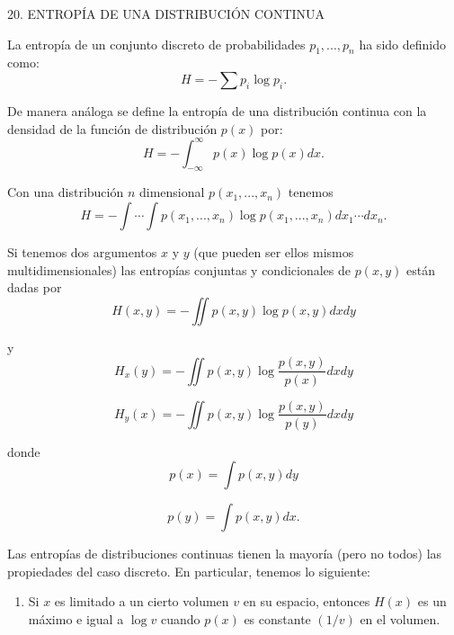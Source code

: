 20. ENTROP\'IA DE UNA DISTRIBUCI\'ON CONTINUA
\newline

La entrop\'ia de un conjunto discreto de probabilidades $p_1, ..., p_n$ ha sido
definido como:
\begin{equation}
  H = -\sum p_i \log p_i.
\end{equation}

De manera an\'aloga se define la entrop\'ia de una distribuci\'on continua con
la densidad de la funci\'on de distribución $p(x)$ por:
\begin{equation}
  H = -\int_{-\infty}^{\infty} p(x) \log p(x)dx.
\end{equation}

Con una distribuci\'on $n$ dimensional $p(x_1, ..., x_n)$ tenemos
\begin{equation}
  H = -\int \cdots \int p(x_1, ..., x_n) \log p(x_1, ..., x_n)dx_1 \cdots dx_n.
\end{equation}

Si tenemos dos argumentos $x$ y $y$ (que pueden ser ellos mismos
multidimensionales) las entrop\'ias conjuntas y condicionales de $p(x, y)$
est\'an dadas por
\begin{equation}
  H(x, y) = -\iint p(x, y) \log p(x, y)dxdy
\end{equation}

y
\begin{equation}
  H_x(y) = -\iint p(x, y) \log \frac{p(x, y)}{p(x)} dxdy
\end{equation}

\begin{equation}
  H_y(x) = -\iint p(x, y) \log \frac{p(x, y)}{p(y)} dxdy
\end{equation}

donde
\begin{equation}
  p(x) = \int p(x, y)dy
\end{equation}

\begin{equation}
  p(y) = \int p(x, y)dx.
\end{equation}

Las entrop\'ias de distribuciones continuas tienen la mayor\'ia (pero no todos)
las propiedades del caso discreto. En particular, tenemos lo siguiente:

\begin{enumerate}
  \item Si $x$ es limitado a un cierto volumen $v$ en su espacio, entonces
  $H(x)$ es un m\'aximo e igual a $\log v$ cuando $p(x)$ es constante
  $(1/v)$ en el volumen.
\end{enumerate}

